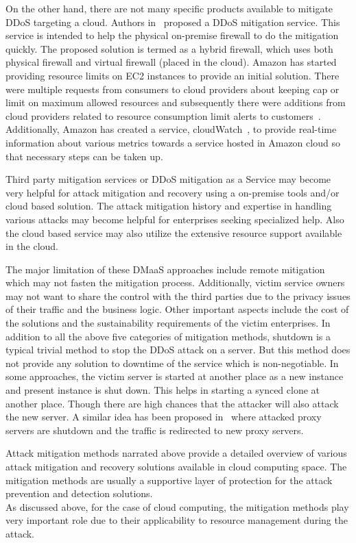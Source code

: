 \documentclass[final,5p,times,twocolumn]{elsarticle}
\begin{document}
On the other hand, there are not many specific products available to mitigate DDoS targeting a cloud. Authors in~\cite{guenane2014reducing} proposed a DDoS mitigation service. This service is intended to help the physical on-premise firewall to do the mitigation quickly. The proposed solution is termed as a hybrid firewall, which uses both physical firewall and virtual firewall (placed in the cloud). Amazon has started providing resource limits on EC2 instances to provide an initial solution. There were multiple requests from consumers to cloud providers about keeping cap or limit on maximum allowed resources and subsequently there were additions from cloud providers related to resource consumption limit alerts to customers~\cite{amazondiscussionforum}. Additionally, Amazon has created a service, cloudWatch~\cite{Cloudwatch}, to provide real-time information about various metrics towards a service hosted in Amazon cloud so that necessary steps can be taken up.  

{Third party mitigation services or DDoS mitigation as a Service may become very helpful for attack mitigation and recovery using a on-premise tools and/or cloud based solution. The attack mitigation history and expertise in handling various attacks may become helpful for enterprises seeking specialized help. Also the cloud based service may also utilize the extensive resource support available in the cloud. }

{The major limitation of these DMaaS approaches include remote mitigation which may not fasten the mitigation process. Additionally, victim service owners may not want to share the control with the third parties due to the privacy issues of their traffic and the business logic. Other important aspects include the cost of the solutions and the sustainability requirements of the victim enterprises. In addition to all the above five categories of mitigation methods, shutdown is a typical trivial method to stop the DDoS attack on a server. But this method does not provide any solution to downtime of the service which is non-negotiable. In some approaches, the victim server is started at another place as a new instance and present instance is shut down. This helps in starting a synced clone at another place. Though there are high chances that the attacker will also attack the new server. A similar idea has been proposed in~\cite{moving} where attacked proxy servers are shutdown and the traffic is redirected to new proxy servers. }

{Attack mitigation methods narrated above provide a detailed overview of various attack mitigation and recovery solutions available in cloud computing space. The mitigation methods are usually a supportive layer of protection for the attack prevention and detection solutions. \\As discussed above, for the case of cloud computing, the mitigation methods play very important role due to their applicability to resource management during the attack. }
\end{document}
